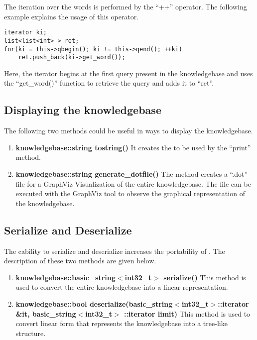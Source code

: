 The iteration over the words is performed by the ``++'' operator. The following example explains the usage of this operator.
\begin{lstlisting}
iterator ki;
list<list<int> > ret;
for(ki = this->qbegin(); ki != this->qend(); ++ki)
	ret.push_back(ki->get_word());
\end{lstlisting}
Here, the iterator begins at the first query present in the knowledgebase and uses the ``get\_word()'' function to retrieve the query and adds it to ``ret''.

\subsection*{Displaying the knowledgebase}
The following two methods could be useful in ways to display the knowledgebase.

\begin{enumerate}

\item \textbf{knowledgebase::string tostring()} \vskip 1pt
It creates the \stringtype to be used by the ``print'' method.

\item \textbf{knowledgebase::string generate\_dotfile()} \vskip 1pt
The method creates a ``.dot'' file for a GraphViz Visualization of the entire knowledgebase. The file can be executed with the GraphViz tool to observe the graphical representation of the knowledgebase. 

\end {enumerate}

\subsection*{Serialize and Deserialize}
The cability to serialize and deserialize increases the portability of \libalf. The description of these two methods are given below.
	
\begin{enumerate}
\item \textbf{knowledgebase::basic\_string$<$int32\_t$>$ serialize()} \hfill \vskip 1pt
This method is used to convert the entire knowledgebase into a linear representation. 
\item \textbf{knowledgebase::bool deserialize(basic\_string$<$int32\_t$>$::iterator \&it, basic\_string$<$int32\_t$>$ ::iterator limit)} \hfill \vskip 1pt
This method is used to convert linear form that represents the knowledgebase into a tree-like structure.
\end{enumerate}	
	
